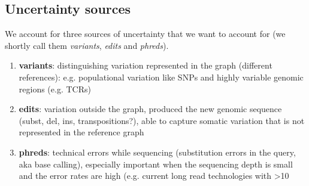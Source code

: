 \subsection{Uncertainty sources}
We account for three sources of uncertainty that we want to account for (we shortly call them \emph{variants}, \emph{edits} and \emph{phreds}).
\begin{enumerate}
	\item \textbf{variants}: distinguishing variation represented in the graph (different references): e.g. populational variation like SNPs and highly variable genomic regions (e.g. TCRs)
	\item \textbf{edits}: variation outside the graph, produced the new genomic sequence (subst, del, ins, transpositions?), able to capture somatic variation that is not represented in the reference graph
	\item \textbf{phreds}: technical errors while sequencing (substitution errors in the query, aka base calling), especially important when the sequencing depth is small and the error rates are high (e.g. current long read technologies with >10%
\end{enumerate}

